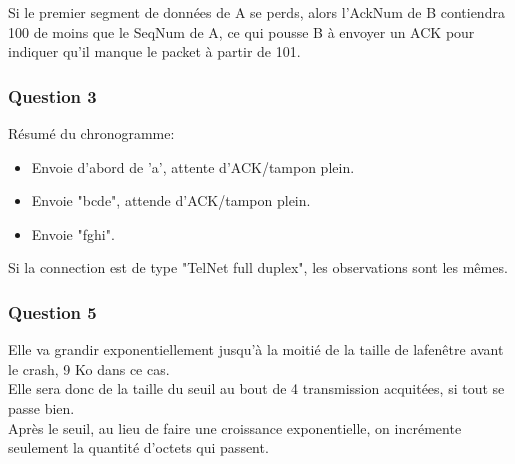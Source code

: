 Si le premier segment de données de A se perds, alors l'AckNum de B contiendra 100 de moins que le SeqNum de A, ce qui pousse B à envoyer un
ACK pour indiquer qu'il manque le packet à partir de 101.

\subsubsection{Question 3}

Résumé du chronogramme:
\begin{itemize}
  \item Envoie d'abord de 'a', attente d'ACK/tampon plein.
  \item Envoie "bcde", attende d'ACK/tampon plein.
  \item Envoie "fghi".
\end{itemize}

Si la connection est de type "TelNet full duplex", les observations sont les mêmes.

\subsubsection{Question 5}

Elle va grandir exponentiellement jusqu'à la moitié de la taille de lafenêtre avant le crash, 9 Ko dans ce cas.\\
Elle sera donc de la taille du seuil au bout de 4 transmission acquitées, si tout se passe bien.\\
Après le seuil, au lieu de faire une croissance exponentielle, on incrémente seulement la quantité d'octets qui passent.

